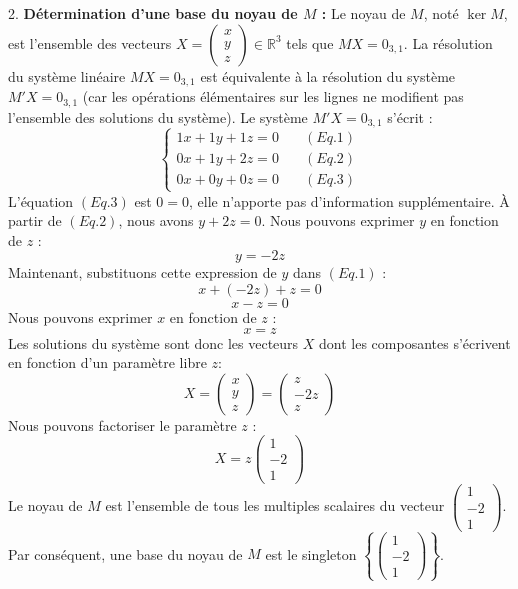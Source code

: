 \documentclass[12pt,a4paper]{report}
\begin{document}
    2.  \textbf{Détermination d'une base du noyau de $M$ :}
        Le noyau de $M$, noté $\ker M$, est l'ensemble des vecteurs $X = \begin{pmatrix} x \\ y \\ z \end{pmatrix} \in \mathbb{R}^3$ tels que $MX = 0_{3,1}$.
        La résolution du système linéaire $MX=0_{3,1}$ est équivalente à la résolution du système $M'X=0_{3,1}$ (car les opérations élémentaires sur les lignes ne modifient pas l'ensemble des solutions du système).
        Le système $M'X=0_{3,1}$ s'écrit :
        $$\begin{cases} 1x + 1y + 1z = 0 \quad &(Eq. 1) \\ 0x + 1y + 2z = 0 \quad &(Eq. 2) \\ 0x + 0y + 0z = 0 \quad &(Eq. 3) \end{cases}$$
        L'équation $(Eq. 3)$ est $0=0$, elle n'apporte pas d'information supplémentaire.
        À partir de $(Eq. 2)$, nous avons $y + 2z = 0$. Nous pouvons exprimer $y$ en fonction de $z$ :
        $$y = -2z$$
        Maintenant, substituons cette expression de $y$ dans $(Eq. 1)$ :
        $$x + (-2z) + z = 0$$
        $$x - z = 0$$
        Nous pouvons exprimer $x$ en fonction de $z$ :
        $$x = z$$
        Les solutions du système sont donc les vecteurs $X$ dont les composantes s'écrivent en fonction d'un paramètre libre $z$:
        $$X = \begin{pmatrix} x \\ y \\ z \end{pmatrix} = \begin{pmatrix} z \\ -2z \\ z \end{pmatrix}$$
        Nous pouvons factoriser le paramètre $z$ :
        $$X = z \begin{pmatrix} 1 \\ -2 \\ 1 \end{pmatrix}$$
        Le noyau de $M$ est l'ensemble de tous les multiples scalaires du vecteur $\begin{pmatrix} 1 \\ -2 \\ 1 \end{pmatrix}$.
        Par conséquent, une base du noyau de $M$ est le singleton $\left\{ \begin{pmatrix} 1 \\ -2 \\ 1 \end{pmatrix} \right\}$.
\end{document}
